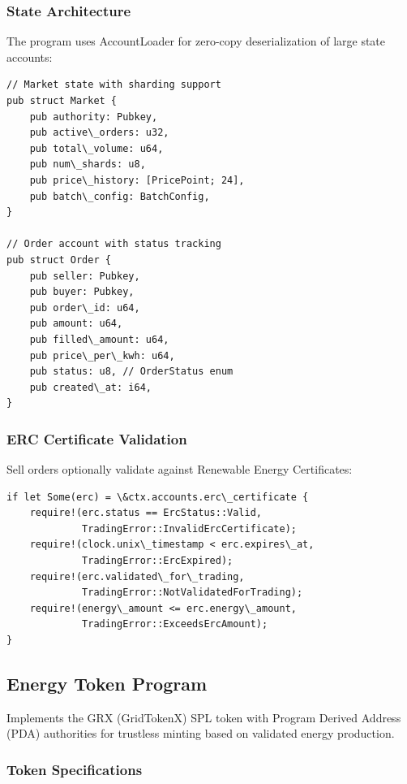 \documentclass[conference]{IEEEtran}
\begin{document}
{\subsubsection{State Architecture}

The program uses AccountLoader for zero-copy deserialization of large state accounts:

\begin{lstlisting}[caption={Trading Program State Structures}]
// Market state with sharding support
pub struct Market {
    pub authority: Pubkey,
    pub active\_orders: u32,
    pub total\_volume: u64,
    pub num\_shards: u8,
    pub price\_history: [PricePoint; 24],
    pub batch\_config: BatchConfig,
}

// Order account with status tracking
pub struct Order {
    pub seller: Pubkey,
    pub buyer: Pubkey,
    pub order\_id: u64,
    pub amount: u64,
    pub filled\_amount: u64,
    pub price\_per\_kwh: u64,
    pub status: u8, // OrderStatus enum
    pub created\_at: i64,
}
\end{lstlisting}

\subsubsection{ERC Certificate Validation}

Sell orders optionally validate against Renewable Energy Certificates:

\begin{lstlisting}[caption={ERC Validation Logic}]
if let Some(erc) = \&ctx.accounts.erc\_certificate {
    require!(erc.status == ErcStatus::Valid, 
             TradingError::InvalidErcCertificate);
    require!(clock.unix\_timestamp < erc.expires\_at, 
             TradingError::ErcExpired);
    require!(erc.validated\_for\_trading, 
             TradingError::NotValidatedForTrading);
    require!(energy\_amount <= erc.energy\_amount, 
             TradingError::ExceedsErcAmount);
}
\end{lstlisting}

\subsection{Energy Token Program}

Implements the GRX (GridTokenX) SPL token with Program Derived Address (PDA) authorities for trustless minting based on validated energy production.

\subsubsection{Token Specifications}

}
\end{document}
